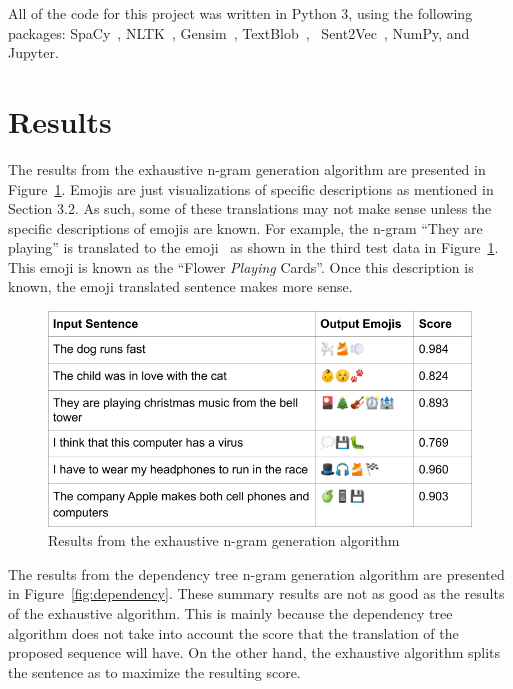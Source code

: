 \documentclass{article}[10]
\newcommand*{\img}[1]{%
  \raisebox{-.3\baselineskip}{%
    \texttt{[image: \#1]}%
  }%
}
\begin{document}
All of the code for this project was written in Python 3, using the
following packages: SpaCy~\cite{spacy2}, NLTK~\cite{bird2009natural},
Gensim~\cite{gensim}, TextBlob~\cite{TextBlob},
~Sent2Vec~\cite{pg2017unsu}, NumPy\cite{numpy}, and
Jupyter\cite{Kluyver:2016aa}.

\section{Results\label{sec:results}}

The results from the exhaustive n-gram generation algorithm are
presented in Figure~\ref{fig:extractive}. Emojis are just
visualizations of specific descriptions as mentioned in Section 3.2. As
such, some of these translations may not make sense unless the specific
descriptions of emojis are known. For example, the n-gram ``They are
playing'' is translated to the emoji~\img{emojis/1f3b4.png} as shown in the third
test data in Figure~\ref{fig:extractive}. This emoji is known
as the ``Flower \emph{Playing} Cards''. Once this description is known, the
emoji translated sentence makes more sense.

\begin{figure}[H]
  \begin{center}
    \includegraphics[width=\columnwidth]{figures/extractive.png}
    \caption{Results from the exhaustive n-gram generation algorithm\label{fig:extractive}}
  \end{center}
\end{figure}

The results from the dependency tree n-gram generation algorithm are
presented in Figure~\ref{fig:dependency}. These summary
results are not as good as the results of the exhaustive algorithm.
This is mainly because the dependency tree algorithm does not take
into account the score that the translation of the proposed sequence
will have. On the other hand, the exhaustive algorithm splits the
sentence as to maximize the resulting score.
\end{document}
